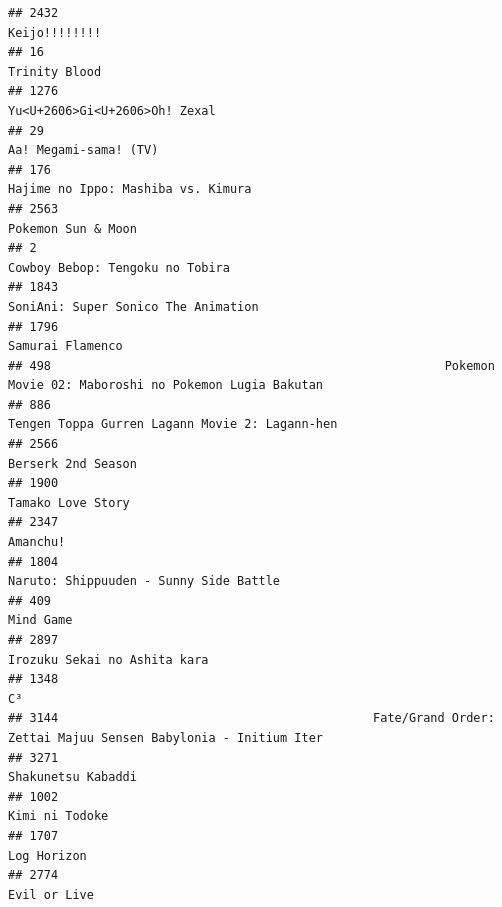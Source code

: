 \documentclass[
]{article}
\begin{document}
\begin{verbatim}
## 2432                                                                                             Keijo!!!!!!!!
## 16                                                                                               Trinity Blood
## 1276                                                                             Yu<U+2606>Gi<U+2606>Oh! Zexal
## 29                                                                                       Aa! Megami-sama! (TV)
## 176                                                                         Hajime no Ippo: Mashiba vs. Kimura
## 2563                                                                                        Pokemon Sun & Moon
## 2                                                                              Cowboy Bebop: Tengoku no Tobira
## 1843                                                                       SoniAni: Super Sonico The Animation
## 1796                                                                                          Samurai Flamenco
## 498                                                       Pokemon Movie 02: Maboroshi no Pokemon Lugia Bakutan
## 886                                                             Tengen Toppa Gurren Lagann Movie 2: Lagann-hen
## 2566                                                                                        Berserk 2nd Season
## 1900                                                                                         Tamako Love Story
## 2347                                                                                                  Amanchu!
## 1804                                                                    Naruto: Shippuuden - Sunny Side Battle
## 409                                                                                                  Mind Game
## 2897                                                                              Irozuku Sekai no Ashita kara
## 1348                                                                                                        C³
## 3144                                            Fate/Grand Order: Zettai Majuu Sensen Babylonia - Initium Iter
## 3271                                                                                        Shakunetsu Kabaddi
## 1002                                                                                            Kimi ni Todoke
## 1707                                                                                               Log Horizon
## 2774                                                                                              Evil or Live

\end{verbatim}
\end{document}
